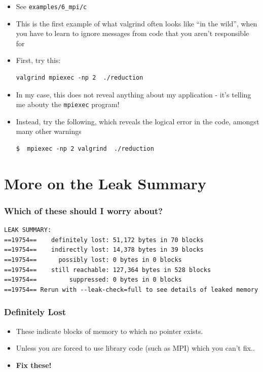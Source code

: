 \documentclass{beamer}
\begin{document}
\begin{frame}[fragile]
\frametitle{}
\begin{itemize}
\item See \texttt{examples/6\_mpi/c}
\item This is the first example of what valgrind often looks like ``in the wild'', when you have to learn to ignore messages from code that you aren't responsible for
\item First, try this:
\begin{lstlisting}
valgrind mpiexec -np 2  ./reduction
\end{lstlisting}
\item In my case, this does not reveal anything about my application - it's telling me abouty the \texttt{mpiexec} program!
\item Instead, try the following, which reveals the logical error in the code, amongst many other warnings
\begin{lstlisting}
$  mpiexec -np 2 valgrind  ./reduction
\end{lstlisting}
\end{itemize}
\end{frame}

\section{More on the Leak Summary}

\begin{frame}[fragile]
\frametitle{Which of these should I worry about?}
\begin{lstlisting}
LEAK SUMMARY:
==19754==    definitely lost: 51,172 bytes in 70 blocks
==19754==    indirectly lost: 14,378 bytes in 39 blocks
==19754==      possibly lost: 0 bytes in 0 blocks
==19754==    still reachable: 127,364 bytes in 528 blocks
==19754==         suppressed: 0 bytes in 0 blocks
==19754== Rerun with --leak-check=full to see details of leaked memory
\end{lstlisting}
\end{frame}

\begin{frame}[fragile]
  \frametitle{Definitely Lost}
  \begin{itemize}
    \item These indicate blocks of memory to which no pointer exists.
    \item Unless you are forced to use library code (such as MPI) which you can't fix..
    \item \textbf{Fix these!}
  \end{itemize}
\end{frame}
\end{document}

